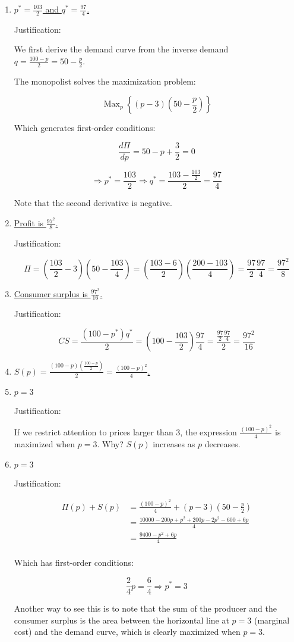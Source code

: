 \documentclass{article}
\DeclareMathOperator*{\Max}{Max}
\newenvironment{solution}{\color{red}}{\color{black}}
\begin{document}
\begin{solution}

\begin{enumerate}
\item\underline{$p^{*}=\frac{103}{2}$ and $q^{*}=\frac{97}{4}$.}

Justification:

We first derive the demand curve from the inverse demand $q=\frac{100-p}{2}=50-\frac{p}{2}$.

The monopolist solves the maximization problem:

\[ \Max_{p} \left\{ (p-3)(50-\frac{p}{2}) \right\} \]

Which generates first-order conditions:

\[ \frac{d \Pi}{d p}=50-p+\frac{3}{2}=0 \]

\[ \Rightarrow p^{*}=\frac{103}{2} \Rightarrow q^{*}=\frac{103-\frac{103}{2}}{2}=\frac{97}{4} \]

Note that the second derivative is negative.

\item\underline{Profit is $\frac{97^2}{8}$.}

Justification:

\[ \Pi=(\frac{103}{2}-3)(50-\frac{103}{4})=(\frac{103-6}{2})(\frac{200-103}{4})=\frac{97}{2}\frac{97}{4}=\frac{97^2}{8} \]

\item\underline{Consumer surplus is $\frac{97^2}{16}$.}

Justification:

\[ CS=\frac{(100-p^{*})q^{*}}{2}=(100-\frac{103}{2})\frac{97}{4}=\frac{\frac{97}{2}\frac{97}{4}}{2}=\frac{97^2}{16} \]

\item\underline{$S(p)=\frac{(100-p)(\frac{100-p}{2})}{2}=\frac{(100-p)^2}{4}$.}

\item\underline{$p=3$}

Justification:

If we restrict attention to prices larger than 3, the expression $\frac{(100-p)^2}{4}$ is maximized when $p=3.$ Why? $S(p)$ increases as $p$ decreases.

\item\underline{$p=3$}

Justification:

\begin{align*}
\Pi(p)+S(p) &= \frac{(100-p)^2}{4}+(p-3)(50-\frac{p}{2}) \\
 &=\frac{10000-200p+p^2+200p-2p^2-600+6p}{4} \\
 &=\frac{9400-p^2+6p}{4}\\
\end{align*}

Which has first-order conditions:

\[ \frac{2}{4}p=\frac{6}{4} \Rightarrow p^{*}=3 \]

Another way to see this is to note that the sum of the producer and the consumer surplus is the area between the horizontal line at $p=3$ (marginal cost) and the demand curve, which is clearly maximized when $p=3$.   
\end{enumerate}

\end{solution}
\end{document}
